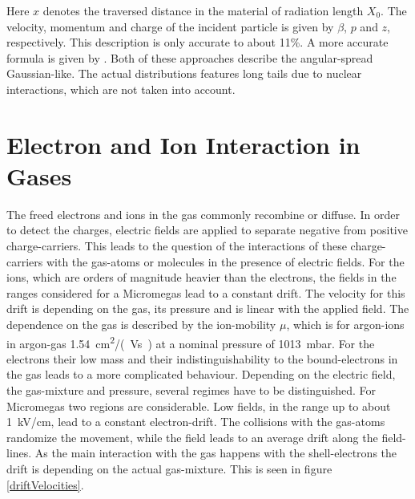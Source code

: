 \documentclass[
twoside,            %
BCOR1.4cm,          %
10pt,               %
headings=normal,    %
headsepline,        %
clearplainpage,		%
final,              %
div=14,
open=right,
bibliography=toc
]{scrreprt}
\begin{document}
Here $x$ denotes the traversed distance in the material of radiation length $X_0$.
The velocity, momentum and charge of the incident particle is given by $\beta$, $p$ and $z$, respectively.
This description is only accurate to about 11\%.
A more accurate formula is given by \cite{multipleScattering}.
Both of these approaches describe the angular-spread Gaussian-like.
The actual distributions features long tails due to nuclear interactions, which are not taken into account.

\section{Electron and Ion Interaction in Gases}\label{gasIntercations}

The freed electrons and ions in the gas commonly recombine or diffuse.
In order to detect the charges, electric fields are applied to separate negative from positive charge-carriers.
This leads to the question of the interactions of these charge-carriers with the gas-atoms or molecules in the presence of electric fields.
For the ions, which are orders of magnitude heavier than the electrons, the fields in the ranges considered for a Micromegas lead to a constant drift.
The velocity for this drift is depending on the gas, its pressure and is linear with the applied field.
The dependence on the gas is described by the ion-mobility $\mu$, which is for argon-ions in argon-gas \SI{1.54}{cm\squared /(Vs)} at a nominal pressure of \SI{1013}{mbar}.
For the electrons their low mass and their indistinguishability to the bound-electrons in the gas leads to a more complicated behaviour.
Depending on the electric field, the gas-mixture and pressure, several regimes have to be distinguished.
For Micromegas two regions are considerable.
Low fields, in the range up to about \SI{1}{kV/cm}, lead to a constant electron-drift.
The collisions with the gas-atoms randomize the movement, while the field leads to an average drift along the field-lines.
As the main interaction with the gas happens with the shell-electrons the drift is depending on the actual gas-mixture.
This is seen in figure \ref{driftVelocities}.
\end{document}
